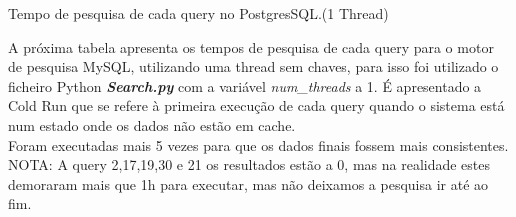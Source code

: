 \documentclass{article}
\begin{document}
\begin{table}[H]
    \caption{Tempo de pesquisa de cada query no PostgresSQL.(1 Thread)}
    \label{tab:BC_Table3}
  \end{table}
\clearpage

\quad A próxima tabela apresenta os tempos de pesquisa de cada query para o motor de pesquisa MySQL, utilizando uma thread sem chaves, para isso foi utilizado o ficheiro Python \textbf{\textit{Search.py}}  com a variável \textit{num\_threads} a 1. 
\quad É apresentado a Cold Run que se refere à primeira execução de cada query quando o sistema está num estado onde os dados não estão em cache.\\
Foram executadas mais 5 vezes para que os dados finais fossem mais consistentes.\\
NOTA: A query 2,17,19,30 e 21 os resultados estão a 0, mas na realidade estes demoraram mais que 1h para executar, mas não deixamos a pesquisa ir até ao fim.
\end{document}
